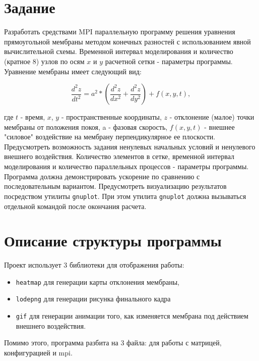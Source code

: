 \section*{Задание}

Разработать средствами MPI параллельную программу решения уравнения
прямоугольной мембраны методом конечных разностей с использованием явной
вычислительной схемы. Временной интервал моделирования и количество (кратное 8)
узлов по осям $x$ и $y$ расчетной сетки - параметры программы. Уравнение мембраны
имеет следующий вид:

$$
    \frac{d^2z}{dt^2} = a^2*(\frac{d^2z}{dx^2}+\frac{d^2z}{dy^2})+f(x,y,t),
$$

где $t$ - время, $x$, $y$ - пространственные координаты, $z$ - отклонение (малое)
точки мембраны от положения покоя, a - фазовая скорость, $f(x,y,t)$ - внешнее
"силовое" воздействие на мембрану перпендикулярное ее плоскости. Предусмотреть
возможность задания ненулевых начальных условий и ненулевого внешнего
воздействия. Количество элементов в сетке, временной интервал моделирования и
количество параллельных процессов - параметры программы. Программа должна
демонстрировать ускорение по сравнению с последовательным вариантом.
Предусмотреть визуализацию результатов посредством утилиты \texttt{gnuplot}. При этом
утилита \texttt{gnuplot} должна вызываться отдельной командой после окончания расчета.

\newpage

\section*{Описание структуры программы}


Проект использует 3 библиотеки для отображения работы: 

\begin{itemize}
    \item \texttt{heatmap} для генерации карты отклонения мембраны,
    \item \texttt{lodepng} для генерации рисунка финального кадра
    \item \texttt{gif} для генерации анимации того, как изменяется мембрана под действием внешнего воздействия.
\end{itemize}

Помимо этого, программа разбита на 3 файла: для работы с матрицей, конфигурацией
и mpi.

